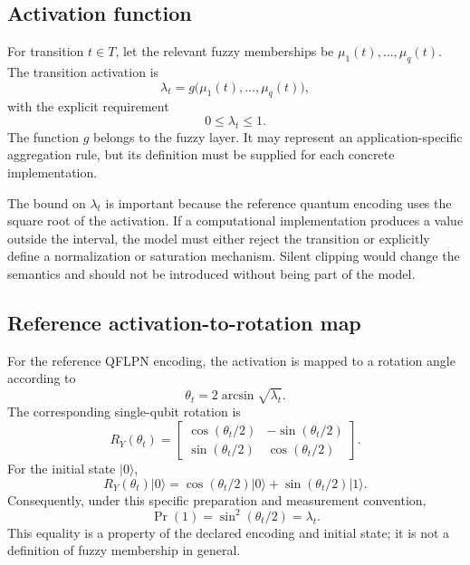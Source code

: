 \documentclass[final,3p,times]{elsarticle}
\begin{document}
\subsection{Activation function}

For transition $t\in T$, let the relevant fuzzy memberships be $\mu_1(t),\ldots,\mu_q(t)$. The transition activation is
\begin{equation}
    \lambda_t=g\bigl(\mu_1(t),\ldots,\mu_q(t)\bigr),
\end{equation}
with the explicit requirement
\begin{equation}
    0\leq\lambda_t\leq1.
\end{equation}
The function $g$ belongs to the fuzzy layer. It may represent an application-specific aggregation rule, but its definition must be supplied for each concrete implementation.

The bound on $\lambda_t$ is important because the reference quantum encoding uses the square root of the activation. If a computational implementation produces a value outside the interval, the model must either reject the transition or explicitly define a normalization or saturation mechanism. Silent clipping would change the semantics and should not be introduced without being part of the model.

\subsection{Reference activation-to-rotation map}

For the reference QFLPN encoding, the activation is mapped to a rotation angle according to
\begin{equation}
    \theta_t=2\arcsin\sqrt{\lambda_t}.
\end{equation}
The corresponding single-qubit rotation is
\begin{equation}
    R_Y(\theta_t)=
    \begin{bmatrix}
        \cos(\theta_t/2) & -\sin(\theta_t/2) \\
        \sin(\theta_t/2) & \cos(\theta_t/2)
    \end{bmatrix}.
\end{equation}
For the initial state $|0\rangle$,
\begin{equation}
    R_Y(\theta_t)|0\rangle
    =
    \cos(\theta_t/2)|0\rangle
    +
    \sin(\theta_t/2)|1\rangle.
\end{equation}
Consequently, under this specific preparation and measurement convention,
\begin{equation}
    \Pr(1)=\sin^2(\theta_t/2)=\lambda_t.\label{eq:p1-reference}
\end{equation}
This equality is a property of the declared encoding and initial state; it is not a definition of fuzzy membership in general.
\end{document}

